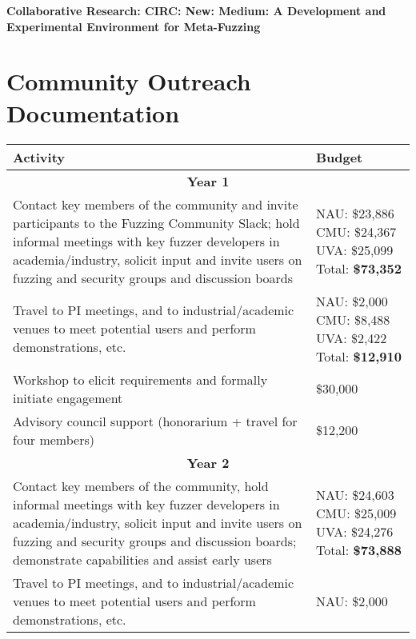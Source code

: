 \documentclass[12pt]{article}
\begin{document}
\begin{center} {\Large\sf\textbf{Collaborative Research: CIRC: New: Medium: A
      Development and Experimental Environment for Meta-Fuzzing}}
\end{center}

\section*{Community Outreach Documentation}


\begin{table}
  \begin{tabular}{|p{12cm}|p{3cm}|}
    \hline
    {\bf Activity} & {\bf Budget} \\
    \hline 
    \multicolumn{2}{c}{{\bf Year 1}} \\
    \hline
    Contact key members of the community and invite participants to the
    Fuzzing Community Slack; hold informal meetings with
    key fuzzer developers in academia/industry, solicit input and
    invite users
    on fuzzing and security groups and discussion boards &  NAU: \$23,886 CMU: \$24,367  UVA: \$25,099
                                                      Total: \textbf{\$73,352} \\
    \hline
    Travel to PI meetings, and to industrial/academic venues to meet
    potential users and perform demonstrations, etc. & NAU: \$2,000
                                                       CMU: \$8,488 UVA:
                                                       \$2,422 Total: \textbf{\$12,910}\\
    \hline
    Workshop to elicit requirements and formally initiate engagement
& \$30,000 \\
    \hline 
    Advisory council support (honorarium + travel for four members) 
  & \$12,200 \\
    \hline
    \hline
    \multicolumn{2}{c}{{\bf Year 2}} \\
    \hline
    \hline
    Contact key members of the community, hold informal meetings with
    key fuzzer developers in academia/industry, solicit input and
    invite users
    on fuzzing and security groups and discussion boards; demonstrate
    capabilities and assist early users&  NAU:  \$24,603 CMU:  \$25,009 UVA: \$24,276
                                                      Total: \textbf{\$73,888}  \\
    \hline
    Travel to PI meetings, and to industrial/academic venues to meet
    potential users and perform demonstrations, etc. & NAU: \$2,000

\end{tabular}
\end{table}
\end{document}
